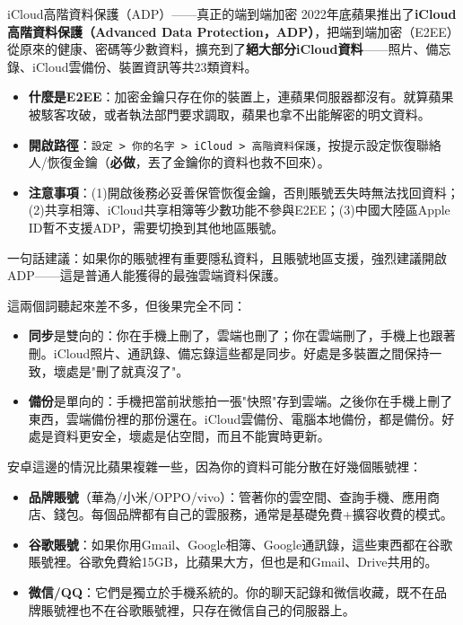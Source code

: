 \begin{tcbwarn}{iCloud高階資料保護（ADP）——真正的端到端加密}
2022年底蘋果推出了\textbf{iCloud高階資料保護（Advanced Data Protection，ADP）}，把端到端加密（E2EE）從原來的健康、密碼等少數資料，擴充到了\textbf{絕大部分iCloud資料}——照片、備忘錄、iCloud雲備份、裝置資訊等共23類資料。

\begin{itemize}
  \item \textbf{什麼是E2EE}：加密金鑰只存在你的裝置上，連蘋果伺服器都沒有。就算蘋果被駭客攻破，或者執法部門要求調取，蘋果也拿不出能解密的明文資料。
  \item \textbf{開啟路徑}：\texttt{設定 > 你的名字 > iCloud > 高階資料保護}，按提示設定恢復聯絡人/恢復金鑰（\textbf{必做}，丟了金鑰你的資料也救不回來）。
  \item \textbf{注意事項}：(1)開啟後務必妥善保管恢復金鑰，否則賬號丟失時無法找回資料；(2)共享相簿、iCloud共享相簿等少數功能不參與E2EE；(3)中國大陸區Apple ID暫不支援ADP，需要切換到其他地區賬號。
\end{itemize}

一句話建議：如果你的賬號裡有重要隱私資料，且賬號地區支援，強烈建議開啟ADP——這是普通人能獲得的最強雲端資料保護。

\end{tcbwarn}


這兩個詞聽起來差不多，但後果完全不同：

\begin{itemize}
  \item \textbf{同步}是雙向的：你在手機上刪了，雲端也刪了；你在雲端刪了，手機上也跟著刪。iCloud照片、通訊錄、備忘錄這些都是同步。好處是多裝置之間保持一致，壞處是"刪了就真沒了"。
  \item \textbf{備份}是單向的：手機把當前狀態拍一張"快照"存到雲端。之後你在手機上刪了東西，雲端備份裡的那份還在。iCloud雲備份、電腦本地備份，都是備份。好處是資料更安全，壞處是佔空間，而且不能實時更新。
\end{itemize}


安卓這邊的情況比蘋果複雜一些，因為你的資料可能分散在好幾個賬號裡：

\begin{itemize}
  \item \textbf{品牌賬號}（華為/小米/OPPO/vivo）：管著你的雲空間、查詢手機、應用商店、錢包。每個品牌都有自己的雲服務，通常是基礎免費+擴容收費的模式。
  \item \textbf{谷歌賬號}：如果你用Gmail、Google相簿、Google通訊錄，這些東西都在谷歌賬號裡。谷歌免費給15GB，比蘋果大方，但也是和Gmail、Drive共用的。
  \item \textbf{微信/QQ}：它們是獨立於手機系統的。你的聊天記錄和微信收藏，既不在品牌賬號裡也不在谷歌賬號裡，只存在微信自己的伺服器上。
\end{itemize}

